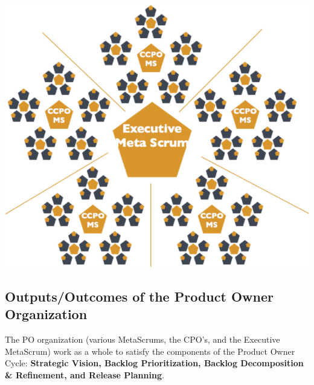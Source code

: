 \documentclass[12pt,a4paper,parskip=full]{scrartcl}
\begin{document}
\includegraphics[width=1.0\linewidth]{ExecMetaScrum.png}

\subsection{Outputs/Outcomes of the Product Owner Organization}
The PO organization (various MetaScrums, the CPO's, and the Executive
MetaScrum) work as a whole to satisfy the components of the Product Owner
Cycle: \textbf{Strategic Vision, Backlog Prioritization, Backlog
Decomposition \& Refinement, and Release Planning}.
\end{document}

